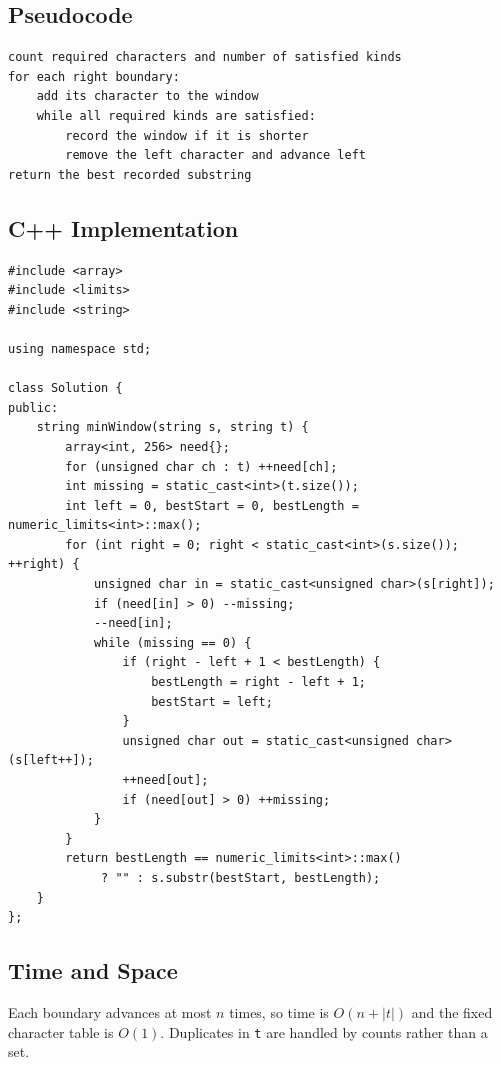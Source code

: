 \subsection{Pseudocode}
\begin{lstlisting}[style=pseudocode]
count required characters and number of satisfied kinds
for each right boundary:
    add its character to the window
    while all required kinds are satisfied:
        record the window if it is shorter
        remove the left character and advance left
return the best recorded substring
\end{lstlisting}

\subsection{C++ Implementation}
\begin{lstlisting}[style=compactcode,caption={Complete C++ solution: Minimum Window Substring}]
#include <array>
#include <limits>
#include <string>

using namespace std;

class Solution {
public:
    string minWindow(string s, string t) {
        array<int, 256> need{};
        for (unsigned char ch : t) ++need[ch];
        int missing = static_cast<int>(t.size());
        int left = 0, bestStart = 0, bestLength = numeric_limits<int>::max();
        for (int right = 0; right < static_cast<int>(s.size()); ++right) {
            unsigned char in = static_cast<unsigned char>(s[right]);
            if (need[in] > 0) --missing;
            --need[in];
            while (missing == 0) {
                if (right - left + 1 < bestLength) {
                    bestLength = right - left + 1;
                    bestStart = left;
                }
                unsigned char out = static_cast<unsigned char>(s[left++]);
                ++need[out];
                if (need[out] > 0) ++missing;
            }
        }
        return bestLength == numeric_limits<int>::max()
             ? "" : s.substr(bestStart, bestLength);
    }
};
\end{lstlisting}

\subsection{Time and Space}
Each boundary advances at most \(n\) times, so time is \(O(n+|t|)\) and the
fixed character table is \(O(1)\). Duplicates in \texttt{t} are handled by
counts rather than a set.

